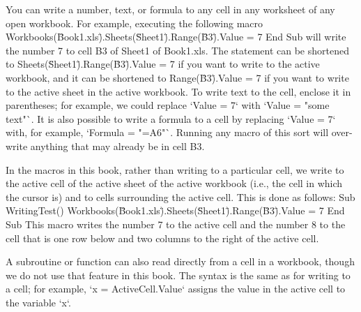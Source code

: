 You can write a number, text, or formula to any cell in any worksheet of any open workbook.  For example, executing the following macro
Workbooks(\"Book1.xls\").Sheets(\"Sheet1\").Range(\"B3\").Value = 7
End Sub
will write the number 7 to cell B3 of Sheet1 of Book1.xls.  The statement can be shortened to
Sheets(\"Sheet1\").Range(\"B3\").Value = 7
if you want to write to the active workbook, 
and it can be shortened to
Range(\"B3\").Value = 7
if you want to write to the active sheet in the active workbook.
To write text to the cell, enclose it in parentheses; for example, we
could replace `Value = 7` with `Value = "some text"`. It is also
possible to write a formula to a cell by replacing `Value = 7` with, for
example, `Formula = "=A6"`. Running any macro of this sort will
over-write anything that may already be in cell B3.

In the macros in this book, rather than writing to a particular cell, we write to the active cell of the active sheet of the active workbook (i.e., the cell in which the cursor is) and to cells surrounding the active cell.  This is done as follows:
Sub WritingTest()
Workbooks(\"Book1.xls\").Sheets(\"Sheet1\").Range(\"B3\").Value = 7
End Sub
This macro writes the number 7 to the active cell and the number 8 to the cell that is one row below and two columns to the right of the active cell. 

A subroutine or function can also read directly from a cell in a
workbook, though we do not use that feature in this book. The syntax is
the same as for writing to a cell; for example, `x = ActiveCell.Value`
assigns the value in the active cell to the variable `x`.

